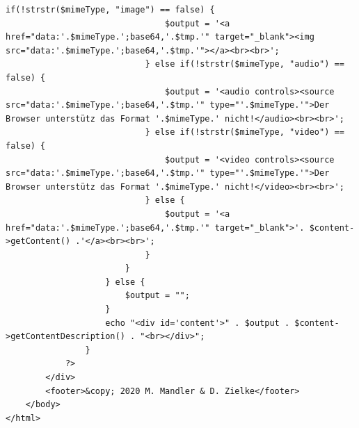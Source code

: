 \documentclass[10.5pt]{scrarticle}
\begin{document}
\begin{lstlisting}[caption={UserHome.php}, label={lst:UserHome}]
                            if(!strstr($mimeType, "image") == false) {
                                $output = '<a href="data:'.$mimeType.';base64,'.$tmp.'" target="_blank"><img src="data:'.$mimeType.';base64,'.$tmp.'"></a><br><br>';
                            } else if(!strstr($mimeType, "audio") == false) {
                                $output = '<audio controls><source src="data:'.$mimeType.';base64,'.$tmp.'" type="'.$mimeType.'">Der Browser unterstütz das Format '.$mimeType.' nicht!</audio><br><br>';
                            } else if(!strstr($mimeType, "video") == false) {
                                $output = '<video controls><source src="data:'.$mimeType.';base64,'.$tmp.'" type="'.$mimeType.'">Der Browser unterstütz das Format '.$mimeType.' nicht!</video><br><br>';
                            } else {
                                $output = '<a href="data:'.$mimeType.';base64,'.$tmp.'" target="_blank">'. $content->getContent() .'</a><br><br>';
                            }
                        }
                    } else {
                        $output = "";
                    }
                    echo "<div id='content'>" . $output . $content->getContentDescription() . "<br></div>";
                }
            ?>
        </div>
        <footer>&copy; 2020 M. Mandler & D. Zielke</footer>
    </body>
</html>
\end{lstlisting}
\end{document}
